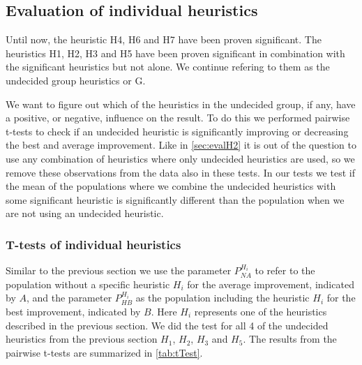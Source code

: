 \documentclass[../main.tex]{subfiles}
\begin{document}
\subsection{Evaluation of individual heuristics}
\label{sec:evalI}
Until now, the heuristic H4, H6 and H7 have been proven significant.
The heuristics H1, H2, H3 and H5 have been proven significant in combination with the significant heuristics but not alone.
We continue refering to them as the undecided group heuristics or G. 
\par
We want to figure out which of the heuristics in the undecided group, if any, have a positive, or negative, influence on the result.
To do this we performed pairwise t-tests to check if an undecided heuristic is significantly improving or decreasing the best and average improvement.
Like in \cref{sec:evalH2} it is out of the question to use any combination of heuristics where only undecided heuristics are used, so we remove these observations from the data also in these tests.
In our tests we test if the mean of the populations where we combine the undecided heuristics with some significant heuristic is significantly different than the population when we are not using an undecided heuristic. 

\subsubsection{T-tests of individual heuristics}
Similar to the previous section we use the parameter $P^{H_i}_{NA}$ to refer to the population without a specific heuristic $H_i$ for the average improvement, indicated by $A$, and the parameter $P^{H_i}_{HB}$ as the population including the heuristic $H_i$ for the best improvement, indicated by $B$. 
Here $H_i$ represents one of the heuristics described in the previous section. 
We did the test for all 4 of the undecided heuristics from the previous section $H_1$, $H_2$, $H_3$ and $H_5$.
The results from the pairwise t-tests are summarized in \cref{tab:tTest}.
\end{document}
